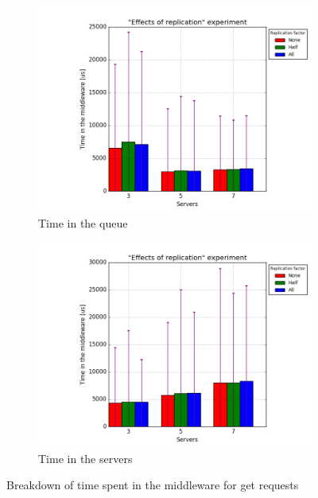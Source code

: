 \documentclass[11pt]{article}
\begin{document}
\begin{figure}
\centering
\begin{subfigure}{.5\textwidth}
	\centering
	\includegraphics[width=\linewidth]{plots/replication-get-queue}
	\caption{Time in the queue}
\end{subfigure}%
\begin{subfigure}{.5\textwidth}
	\centering
	\includegraphics[width=\linewidth]{plots/replication-get-servers}
	\caption{Time in the servers}
\end{subfigure}
\caption{Breakdown of time spent in the middleware for get requests}
\label{fig:replication-get-breakdown}
\end{figure}
\end{document}
